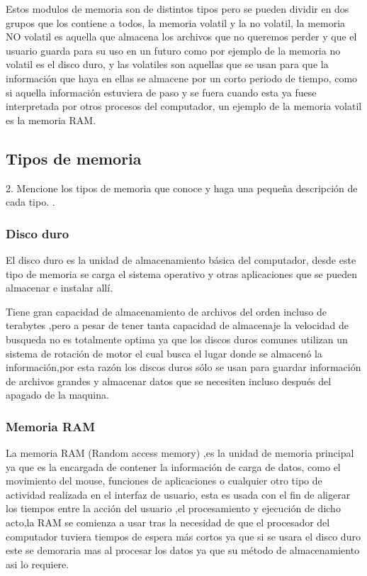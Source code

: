 \documentclass{article}
\begin{document}
\vspace{0.3cm}
Estos modulos de memoria son de distintos tipos pero se pueden dividir en dos grupos que los contiene a todos, la memoria volatil y la no volatil, la memoria NO volatil es aquella que almacena los archivos que no queremos perder y que el usuario guarda para su uso en un futuro como por ejemplo de la memoria no volatil es el disco duro, y las volatiles son aquellas que se usan para que la información que haya en ellas se almacene por un corto periodo de tiempo, como si aquella información estuviera de paso y se fuera cuando esta ya fuese interpretada por otros procesos del computador, un ejemplo de la memoria volatil es la memoria RAM.

\vfill
\vspace{0.9cm}
\subsection{Tipos de memoria}
2. Mencione los tipos de memoria que conoce y haga una pequeña descripción de cada tipo.
. \cite{refer}
\subsubsection{Disco duro}
El disco duro es la unidad de almacenamiento básica del computador, desde este tipo de memoria se carga el sistema operativo y otras aplicaciones que se pueden almacenar e instalar allí.

Tiene gran capacidad de almacenamiento de archivos del orden incluso de terabytes ,pero a pesar de tener tanta capacidad de almacenaje la velocidad de busqueda no es totalmente optima ya que los discos duros comunes utilizan un sistema de rotación de motor el cual busca el lugar donde se almacenó la información,por esta razón los discos duros sólo se usan para guardar información de archivos grandes y almacenar datos que se necesiten incluso después del apagado de la maquina.
\subsubsection{Memoria RAM}\label{memorias}
La memoria RAM (Random access memory) ,es la unidad de memoria principal ya que es la  encargada de contener la información de carga de datos, como el movimiento del mouse, funciones de aplicaciones o cualquier otro tipo de actividad realizada en el interfaz de usuario, esta es usada con el fin de aligerar los tiempos entre la acción del usuario ,el procesamiento y ejecución de dicho acto,la RAM se comienza a usar tras la necesidad de que el procesador del computador tuviera tiempos de espera más cortos  ya que si se usara el disco duro este se demoraria mas al procesar los datos ya que su método de almacenamiento asi lo requiere.
\end{document}
